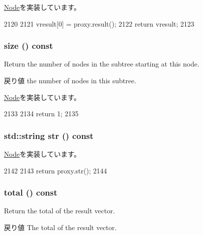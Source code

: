 \hyperlink{classStats_1_1Node_a7fcf57115122663db42f39cc18ca0f62}{Node}を実装しています。


\begin{DoxyCode}
2120     {
2121         vresult[0] = proxy.result();
2122         return vresult;
2123     }
\end{DoxyCode}
\hypertarget{classStats_1_1ScalarProxyNode_a503ab01f6c0142145d3434f6924714e7}{
\subsubsection[{size}]{ size () const}}
\label{classStats_1_1ScalarProxyNode_a503ab01f6c0142145d3434f6924714e7}
Return the number of nodes in the subtree starting at this node. \begin{DoxyReturn}{戻り値}
the number of nodes in this subtree. 
\end{DoxyReturn}


\hyperlink{classStats_1_1Node_a4051d143efd31726fa13df03ae4e1bce}{Node}を実装しています。


\begin{DoxyCode}
2133     {
2134         return 1;
2135     }
\end{DoxyCode}
\hypertarget{classStats_1_1ScalarProxyNode_a1b9b8885b0880fc4ddf9a2c7d1ca3dc4}{
\subsubsection[{str}]{\setlength{\rightskip}{0pt plus 5cm}std::string str () const}}
\label{classStats_1_1ScalarProxyNode_a1b9b8885b0880fc4ddf9a2c7d1ca3dc4}


\hyperlink{classStats_1_1Node_a6522bc65bd97a6b1ef6cdfe78462a919}{Node}を実装しています。


\begin{DoxyCode}
2142     {
2143         return proxy.str();
2144     }
\end{DoxyCode}
\hypertarget{classStats_1_1ScalarProxyNode_a35c6e2ed3fc81b40d69052a062113ead}{
\subsubsection[{total}]{ total () const}}
\label{classStats_1_1ScalarProxyNode_a35c6e2ed3fc81b40d69052a062113ead}
Return the total of the result vector. \begin{DoxyReturn}{戻り値}
The total of the result vector. 
\end{DoxyReturn}


